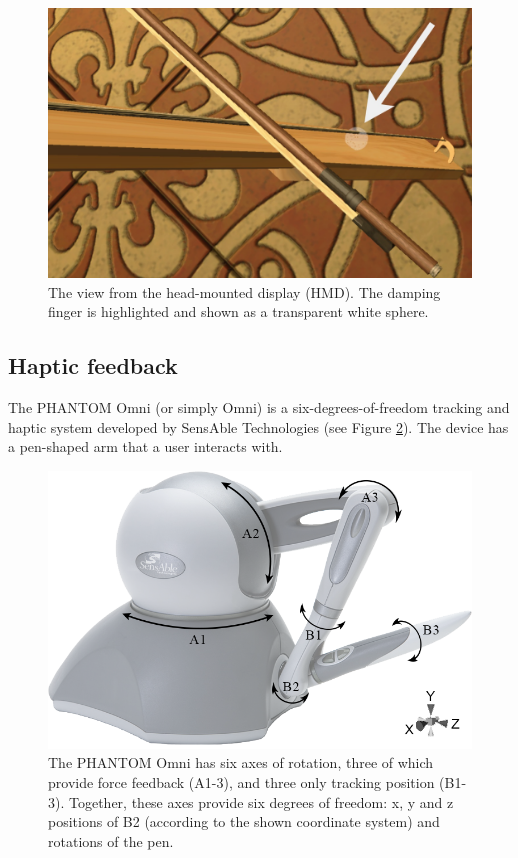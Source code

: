 \documentclass[dvipsnames, pdftex]{article}
\begin{document}
\begin{figure}[ht]\includegraphics[width=1.0\columnwidth]{SMC 2020 paper template LaTeX/figures/vrView.jpg}
\centering
  \caption{The view from the head-mounted display (HMD). The damping finger is highlighted and shown as a transparent white sphere. \label{fig:vrView}}
\end{figure}

\subsection{Haptic feedback}
The PHANTOM Omni (or simply Omni) is a six-degrees-of-freedom tracking and haptic system developed by SensAble Technologies (see Figure \ref{fig:omni}). The device has a pen-shaped arm that a user interacts with.  

\begin{figure}[t]\includegraphics[width=1.0\columnwidth]{figures/omniSchematic.png}
\centering
  \caption{The PHANTOM Omni has six axes of rotation, three of which provide force feedback (A1-3), and three only tracking position (B1-3). Together, these axes provide six degrees of freedom: x, y and z positions of B2 (according to the shown coordinate system) and rotations of the pen. \label{fig:omni}}
\end{figure}
\end{document}

